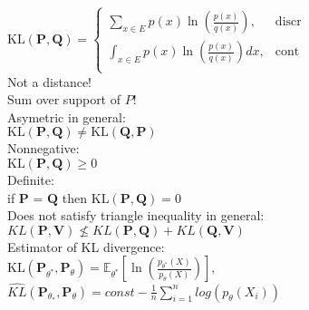 $ \text {KL}(\mathbf{P}, \mathbf{Q}) =
	\begin{cases}
		  \sum _{x \in E} p(x) \ln \left( \frac{p(x)}{q(x)} \right),&\text{discr}\\
		 
		{\int }_{x \in E} p(x) \ln \left( \frac{p(x)}{q(x)}\right)dx,&\text{cont}\\
	\end{cases}
$\\
Not a distance!\\
Sum over support of $P$!\\
Asymetric in general:\\
$\text {KL}(\mathbf{P}, \mathbf{Q}) \neq \text {KL}(\mathbf{Q}, \mathbf{P})$\\
Nonnegative:\\
$\text {KL}(\mathbf{P}, \mathbf{Q}) \geq 0$\\
Definite:\\
if $\mathbf{P}$ = $\mathbf{Q}$ then $\text {KL}(\mathbf{P}, \mathbf{Q}) = 0$\\
Does not satisfy triangle inequality in general:\\
$KL(\mathbf{P}, \mathbf{V}) \nleq KL(\mathbf{P}, \mathbf{Q}) + KL(\mathbf{Q}, \mathbf{V})$\\

Estimator of KL divergence:\\
$\displaystyle  \text {KL}\left(\mathbf{P}_{\theta ^*}, \mathbf{P}_{\theta }\right) = \mathbb {E}_{\theta ^*}\left[\ln \left(\frac{p_{\theta ^*}(X)}{p_{\theta }(X)}\right)\right],$ \\

$\widehat{KL}(\mathbf{P}_{\theta_{*}},\mathbf{P}_{\theta}) = const - \frac{1}{n} \sum_{i=1}^{n} log(p_{\theta}(X_i))$ 